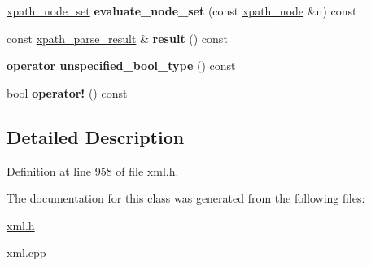 \begin{DoxyCompactItemize}
\item 
\hypertarget{classphys_1_1xml_1_1xpath__query_a885b83b3082e88c477934e72b19a65ae}{
\hyperlink{classphys_1_1xml_1_1xpath__node__set}{xpath\_\-node\_\-set} {\bfseries evaluate\_\-node\_\-set} (const \hyperlink{classphys_1_1xml_1_1xpath__node}{xpath\_\-node} \&n) const }
\label{de/d9e/classphys_1_1xml_1_1xpath__query_a885b83b3082e88c477934e72b19a65ae}

\item 
\hypertarget{classphys_1_1xml_1_1xpath__query_a1b57c9d69fff49b94b03ad33132d8531}{
const \hyperlink{structphys_1_1xml_1_1xpath__parse__result}{xpath\_\-parse\_\-result} \& {\bfseries result} () const }
\label{de/d9e/classphys_1_1xml_1_1xpath__query_a1b57c9d69fff49b94b03ad33132d8531}

\item 
\hypertarget{classphys_1_1xml_1_1xpath__query_a97998963246521002d11ba405f8e6b32}{
{\bfseries operator unspecified\_\-bool\_\-type} () const }
\label{de/d9e/classphys_1_1xml_1_1xpath__query_a97998963246521002d11ba405f8e6b32}

\item 
\hypertarget{classphys_1_1xml_1_1xpath__query_ae06c5426b9e32143b1881cf12af50390}{
bool {\bfseries operator!} () const }
\label{de/d9e/classphys_1_1xml_1_1xpath__query_ae06c5426b9e32143b1881cf12af50390}

\end{DoxyCompactItemize}


\subsection{Detailed Description}


Definition at line 958 of file xml.h.



The documentation for this class was generated from the following files:\begin{DoxyCompactItemize}
\item 
\hyperlink{xml_8h}{xml.h}\item 
xml.cpp\end{DoxyCompactItemize}
